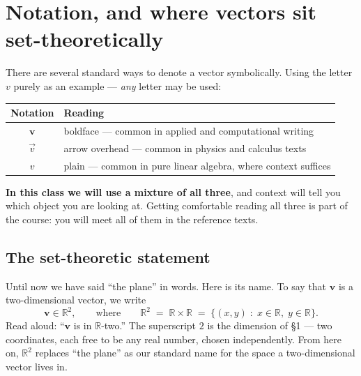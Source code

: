 \documentclass[11pt]{article}
\theoremstyle{definition}
\theoremstyle{remark}
\newcommand{\R}{\mathbb{R}}
\newcommand{\vc}[1]{\mathbf{#1}}
\begin{document}
\begin{center}
\end{center}

\section{Notation, and where vectors sit set-theoretically}
There are several standard ways to denote a vector symbolically. Using the
letter $v$ purely as an example --- \emph{any} letter may be used:

\begin{center}
\renewcommand{\arraystretch}{1.35}
\begin{tabular}{@{}c l@{}}
\toprule
\textbf{Notation} & \textbf{Reading} \\
\midrule
$\vc{v}$      & boldface --- common in applied and computational writing \\
$\vec{v}$     & arrow overhead --- common in physics and calculus texts \\
$v$           & plain --- common in pure linear algebra, where context suffices \\
\bottomrule
\end{tabular}
\end{center}

\noindent\textbf{In this class we will use a mixture of all three}, and context
will tell you which object you are looking at. Getting comfortable reading all
three is part of the course: you will meet all of them in the reference texts.

\subsection*{The set-theoretic statement}
Until now we have said ``the plane'' in words. Here is its name. To say that
$\vc{v}$ is a two-dimensional vector, we write
\[
  \vc{v}\in\R^{2},
  \qquad\text{where}\qquad
  \R^{2}\;=\;\R\times\R\;=\;\bigl\{(x,y)\;:\;x\in\R,\;y\in\R\bigr\}.
\]
Read aloud: ``$\vc{v}$ is in $\R$-two.'' The superscript $2$ is the dimension of
\S1 --- two coordinates, each free to be any real number, chosen independently.
From here on, $\R^{2}$ replaces ``the plane'' as our standard name for the space
a two-dimensional vector lives in.
\end{document}
